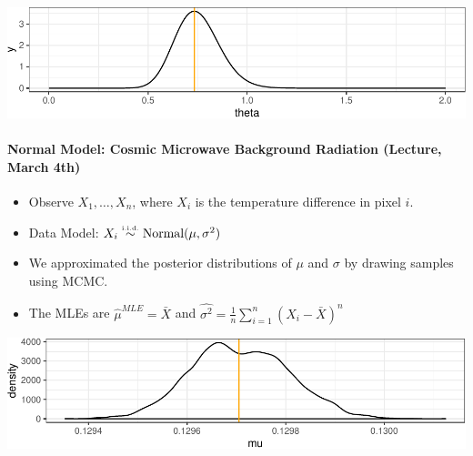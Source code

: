 \documentclass[]{article}
\newenvironment{Shaded}{\begin{snugshade}}{\end{snugshade}}
\newcommand{\KeywordTok}[1]{\textcolor[rgb]{0.13,0.29,0.53}{\textbf{#1}}}
\newcommand{\DataTypeTok}[1]{\textcolor[rgb]{0.13,0.29,0.53}{#1}}
\newcommand{\StringTok}[1]{\textcolor[rgb]{0.31,0.60,0.02}{#1}}
\newcommand{\OperatorTok}[1]{\textcolor[rgb]{0.81,0.36,0.00}{\textbf{#1}}}
\newcommand{\NormalTok}[1]{#1}
\providecommand{\tightlist}{%
  \setlength{\itemsep}{0pt}\setlength{\parskip}{0pt}}
\let\oldparagraph\paragraph
\renewcommand{\paragraph}[1]{\oldparagraph{#1}\mbox{}}
\begin{document}
\includegraphics{20190306_normal_approx_posterior_files/figure-latex/unnamed-chunk-5-1.pdf}

\paragraph{Normal Model: Cosmic Microwave Background Radiation (Lecture,
March
4th)}\label{normal-model-cosmic-microwave-background-radiation-lecture-march-4th}

\begin{itemize}
\tightlist
\item
  Observe \(X_1, \ldots, X_n\), where \(X_i\) is the temperature
  difference in pixel \(i\).
\item
  Data Model: \(X_i \stackrel{{\mbox{\text{\tiny i.i.d.}}}}{\sim} \text{Normal}(\mu, \sigma^2)\)
\item
  We approximated the posterior distributions of \(\mu\) and \(\sigma\)
  by drawing samples using MCMC.
\item
  The MLEs are \(\hat{\mu}^{MLE} = \bar{X}\) and
  \(\hat{\sigma^2} = \frac{1}{n}\sum_{i=1}^n(X_i - \bar{X})^n\)
\end{itemize}

\begin{Shaded}
\end{Shaded}

\includegraphics{20190306_normal_approx_posterior_files/figure-latex/unnamed-chunk-8-1.pdf}
\end{document}
